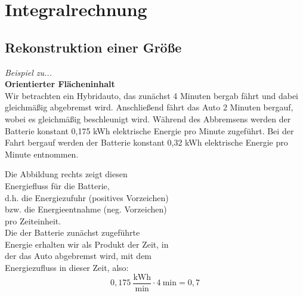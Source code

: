 \chapter{Integralrechnung}
\section{Rekonstruktion einer Größe}
\textit{Beispiel zu...} \\
\textbf{Orientierter Flächeninhalt}\\
Wir betrachten ein Hybridauto, das zunächst 4 Minuten bergab fährt und dabei gleichmäßig abgebremst wird. Anschließend fährt das Auto 2 Minuten bergauf, wobei es gleichmäßig beschleunigt wird. Während des Abbremsens werden der Batterie konstant 0,175 kWh elektrische Energie pro Minute zugeführt. Bei der Fahrt bergauf werden der Batterie konstant 0,32 kWh elektrische Energie pro Minute entnommen. \\

\begin{minipage}{0.5\textwidth}
    Die Abbildung rechts zeigt diesen \\ 
    Energiefluss für die Batterie, \\
    d.h. die Energiezufuhr (positives Vorzeichen) \\
    bzw. die Energieentnahme (neg. Vorzeichen) \\
    pro Zeiteinheit. \\
    
    Die der Batterie zunächst zugeführte \\
    Energie erhalten wir als Produkt der Zeit, in \\
    der das Auto abgebremst wird, mit dem \\
    Energiezufluss in dieser Zeit, also: $$0,175 \ \frac{\text{kWh}}{\text{min}} \cdot 4 \ \text{min} = 0,7$$
\end{minipage}
\begin{minipage}{0.5\textwidth}
\end{minipage}


